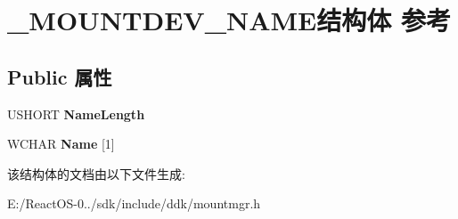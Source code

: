 \hypertarget{struct___m_o_u_n_t_d_e_v___n_a_m_e}{}\section{\+\_\+\+M\+O\+U\+N\+T\+D\+E\+V\+\_\+\+N\+A\+M\+E结构体 参考}
\label{struct___m_o_u_n_t_d_e_v___n_a_m_e}
\subsection*{Public 属性}
\begin{DoxyCompactItemize}
\item 
\mbox{\label{struct___m_o_u_n_t_d_e_v___n_a_m_e_a4d3ce99a451dd8e3aa797bb7a31564a2}} 
U\+S\+H\+O\+RT {\bfseries Name\+Length}
\item 
\mbox{\label{struct___m_o_u_n_t_d_e_v___n_a_m_e_a67824d1367860361cf12201b44523603}} 
W\+C\+H\+AR {\bfseries Name} \mbox{[}1\mbox{]}
\end{DoxyCompactItemize}


该结构体的文档由以下文件生成\+:\begin{DoxyCompactItemize}
\item 
E\+:/\+React\+O\+S-\/0../sdk/include/ddk/mountmgr.\+h\end{DoxyCompactItemize}
